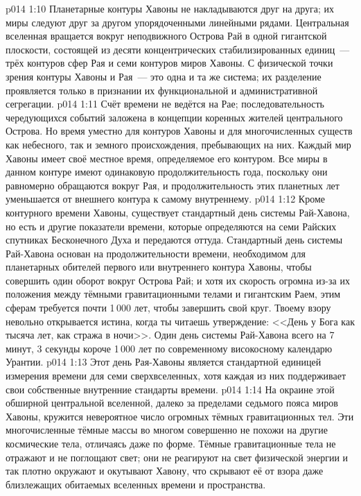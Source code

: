 \vs p014 1:10 Планетарные контуры Хавоны не накладываются друг на друга; их миры следуют друг за другом упорядоченными линейными рядами. Центральная вселенная вращается вокруг неподвижного Острова Рай в одной гигантской плоскости, состоящей из десяти концентрических стабилизированных единиц~--- трёх контуров сфер Рая и семи контуров миров Хавоны. С физической точки зрения контуры Хавоны и Рая~--- это одна и та же система; их разделение проявляется только в признании их функциональной и административной сегрегации.
\vs p014 1:11 \pc Счёт времени не ведётся на Рае; последовательность чередующихся событий заложена в концепции коренных жителей центрального Острова. Но время уместно для контуров Хавоны и для многочисленных существ как небесного, так и земного происхождения, пребывающих на них. Каждый мир Хавоны имеет своё местное время, определяемое его контуром. Все миры в данном контуре имеют одинаковую продолжительность года, поскольку они равномерно обращаются вокруг Рая, и продолжительность этих планетных лет уменьшается от внешнего контура к самому внутреннему.
\vs p014 1:12 Кроме контурного времени Хавоны, существует стандартный день системы Рай\hyp{}Хавона, но есть и другие показатели времени, которые определяются на семи Райских спутниках Бесконечного Духа и передаются оттуда. Стандартный день системы Рай\hyp{}Хавона основан на продолжительности времени, необходимом для планетарных обителей первого или внутреннего контура Хавоны, чтобы совершить один оборот вокруг Острова Рай; и хотя их скорость огромна из-за их положения между тёмными гравитационными телами и гигантским Раем, этим сферам требуется почти 1\,000 лет, чтобы завершить свой круг. Твоему взору невольно открывается истина, когда ты читаешь утверждение: <<День у Бога как тысяча лет, как стража в ночи>>. Один день системы Рай\hyp{}Хавона всего на 7 минут, 3 секунды короче 1\,000 лет по современному високосному календарю Урантии.
\vs p014 1:13 Этот день Рая\hyp{}Хавоны является стандартной единицей измерения времени для семи сверхвселенных, хотя каждая из них поддерживает свои собственные внутренние стандарты времени.
\vs p014 1:14 \pc На окраине этой обширной центральной вселенной, далеко за пределами седьмого пояса миров Хавоны, кружится невероятное число огромных тёмных гравитационных тел. Эти многочисленные тёмные массы во многом совершенно не похожи на другие космические тела, отличаясь даже по форме. Тёмные гравитационные тела не отражают и не поглощают свет; они не реагируют на свет физической энергии и так плотно окружают и окутывают Хавону, что скрывают её от взора даже близлежащих обитаемых вселенных времени и пространства.
